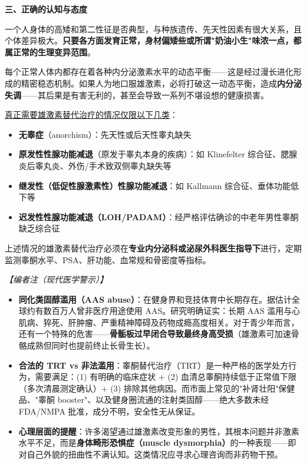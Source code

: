 \begin{enumerate}
\vspace{0.5em}
\noindent\textbf{三、正确的认知与态度}

一个人身体的高矮和第二性征是否典型，与种族遗传、先天性因素有很大关系，且个体差异极大。\textbf{只要各方面发育正常，身材偏矮些或所谓"奶油小生"味浓一点，都属正常的生理变异范围}。

每个正常人体内都存在着各种内分泌激素水平的动态平衡——这是经过漫长进化形成的精密稳态机制。如果人为地口服雄激素，必将打破这一动态平衡，造成\textbf{内分泌失调}——其后果是有害无利的，甚至会导致一系列不堪设想的健康损害。

\vspace{0.3em}
\underline{真正需要雄激素替代治疗的情况仅限以下几类}：
\begin{itemize}
	\item \textbf{无睾症}（anorchism）：先天性或后天性睾丸缺失
	\item \textbf{原发性性腺功能减退}（原发于睾丸本身的疾病）：如 Klinefelter 综合征、腮腺炎后睾丸炎、外伤/手术致双侧睾丸缺失等
	\item \textbf{继发性（低促性腺激素性）性腺功能减退}：如 Kallmann 综合征、垂体功能低下等
	\item \textbf{迟发性性腺功能减退（LOH/PADAM）}：经严格评估确诊的中老年男性睾酮缺乏综合征
\end{itemize}

上述情况的雄激素替代治疗必须在\textbf{专业内分泌科或泌尿外科医生指导下}进行，定期监测睾酮水平、PSA、肝功能、血常规和骨密度等指标。

\vspace{0.5em}
\noindent\textit{【编者注（现代医学警示）】}
\begin{itemize}
	\item \textbf{同化类固醇滥用（AAS abuse）}：在健身界和竞技体育中长期存在。据估计全球约有数百万人曾非医疗用途使用 AAS。研究明确证实：长期 AAS 滥用与心肌病、猝死、肝肿瘤、严重精神障碍及药物成瘾高度相关。对于青少年而言，还有一个特殊的危害——\textbf{骨骺板过早闭合导致最终身高受损}（雄激素可加速骨骼成熟但同时也提前终止长骨生长）。
	\item \textbf{合法的 TRT vs 非法滥用}：睾酮替代治疗（TRT）是一种严格的医学处方行为，需要满足：(1) 有明确的临床症状 + (2) 血清总睾酮持续低于正常值下限（多次清晨测定确认）+ (3) 排除其他病因。而市面上常见的"补肾壮阳"保健品、"睾酮 booster"、以及健身圈流通的注射类固醇——绝大多数未经 FDA/NMPA 批准，成分不明，安全性无从保证。
	\item \textbf{心理层面的提醒}：许多渴望通过雄激素改变形象的男性，其根本问题并非激素水平不足，而是\textbf{身体畸形恐惧症（muscle dysmorphia）}的一种表现——即对自己外貌的扭曲性不满认知。这类情况应寻求心理咨询而非药物干预。
\end{itemize}


\end{enumerate}
